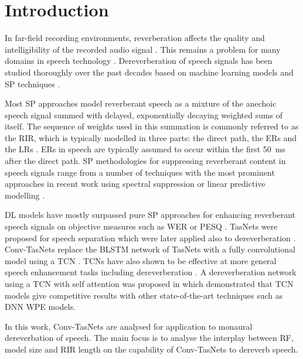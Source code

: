 \documentclass[conference,a4paper]{IEEEtran}
\begin{document}
\section{Introduction}
In 
{far-field} recording environments, reverberation affects the quality and intelligibility of the recorded audio signal {\cite{NG10}}. This remains a problem for many domains in speech technology
\cite{FFASRHaebUmbach,Hain}. Dereverberation of speech signals has been studied thoroughly over the past {decades}
\cite{Cauchi_REVERB_2015,1161990}
{based on machine}
learning models and \ac{SP} techniques 
\cite{FFASRHaebUmbach,habets2007single}.


Most \ac{SP} approaches model reverberant speech 
as a mixture of the {anechoic} speech signal summed with delayed{,} exponentially decaying weighted sums of itself. The sequence of weights used in this summation is commonly referred to as the \ac{RIR}{, which }is typically modelled in three parts: the direct path, the \acp{ER} and the \acp{LR} \cite{habets2007single}. \Acp{ER} in speech are typically assumed to occur within the first {50~ms after}
the direct path.
\ac{SP} methodologies for 
suppressing reverberant content in speech signals range from a number of techniques with the most prominent approaches in recent work using {spectral suppression or} linear predictive modelling \cite{Park2018,Zhang2020OnEM}. 

\ac{DL} models have mostly surpassed pure \ac{SP} approaches for enhancing reverberant speech signals on objective measures such as 
\ac{WER} 
{or} \ac{PESQ} \cite{Purushothaman,Kinoshita2017,9095210}. 
{\Acp{TasNet} \cite{tasnet} were} proposed for speech separation which 
{were} later applied also to dereverberation \cite{reverbtasnet}. 
{\Acp{Conv-TasNet} \cite{convtasnet} replace} 
the BLSTM network of 
{\acp{TasNet}}
with a fully convolutional model using a \ac{TCN} \cite{tcn}. \acp{TCN} have also shown to be effective at more general speech enhancement tasks including dereverberation \cite{WHAMR}. A dereverberation network using a \ac{TCN} with self attention was proposed {in} \cite{9095210} which demonstrated {that} \ac{TCN} models give competitive results with other state-of-the-art techniques such as \ac{DNN} \ac{WPE} models.

In this work, 
{\acp{Conv-TasNet} are analysed for} 
application to monaural dereverbation of speech. 
{The main}
focus 
is to {analyse}
the interplay between \ac{RF}, model size and \ac{RIR} length on the capability of Conv-TasNets to dereverb speech.
\end{document}
